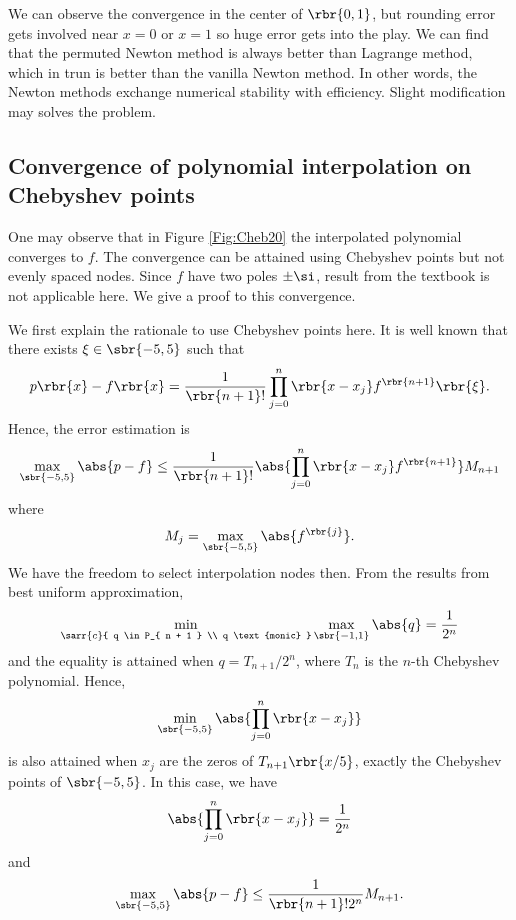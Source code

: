 \documentclass[english, nochinese]{pnote}
\begin{document}
We can observe the convergence in the center of $ \rbr{ 0, 1 } $, but rounding error gets involved near $ x = 0 $ or $ x = 1 $ so huge error gets into the play. We can find that the permuted Newton method is always better than Lagrange method, which in trun is better than the vanilla Newton method. In other words, the Newton methods exchange numerical stability with efficiency. Slight modification may solves the problem.

\subsection{Convergence of polynomial interpolation on Chebyshev points}

One may observe that in Figure \ref{Fig:Cheb20} the interpolated polynomial converges to $f$. The convergence can be attained using Chebyshev points but not evenly spaced nodes. Since $f$ have two poles $ \pm \si $, result from the textbook is not applicable here. We give a proof to this convergence.

We first explain the rationale to use Chebyshev points here. It is well known that there exists $ \xi \in \sbr{ -5, 5 } $ such that
\begin{equation}
p \rbr{x} - f \rbr{x} = \frac{1}{ \rbr{ n + 1 } ! } \prod_{ j = 0 }^n \rbr{ x - x_j } f^{\rbr{ n + 1 }} \rbr{\xi}.
\end{equation}
Hence, the error estimation is
\begin{equation}
\max_{\sbr{ -5, 5 }} \abs{ p - f } \le \frac{1}{ \rbr{ n + 1 } ! } \abs{ \prod_{ j = 0 }^n \rbr{ x - x_j } f^{\rbr{ n + 1 }} } M_{ n + 1 }
\end{equation}
where
\begin{equation}
M_j = \max_{\sbr{ -5, 5 }} \abs{f^{\rbr{j}}}.
\end{equation}
We have the freedom to select interpolation nodes then. From the results from best uniform approximation,
\begin{equation}
\min_{\sarr{c}{ q \in P_{ n + 1 } \\ q \text{monic} }} \max_{\sbr{ -1, 1 }} \abs{q} = \frac{1}{2^n}
\end{equation}
and the equality is attained when $ q = T_{ n + 1 } / 2^n $, where $T_n$ is the $n$-th Chebyshev polynomial. Hence,
\begin{equation}
\min_{\sbr{ -5, 5 }} \abs{ \prod_{ j = 0 }^n \rbr{ x - x_j } }
\end{equation}
is also attained when $x_j$ are the zeros of $ T_{ n + 1 } \rbr{ x / 5 } $, exactly the Chebyshev points of $ \sbr{ -5, 5 } $. In this case, we have
\begin{equation}
\abs{ \prod_{ j = 0 }^n \rbr{ x - x_j } } = \frac{1}{2^n}
\end{equation}
and
\begin{equation}
\max_{\sbr{ -5, 5 }} \abs{ p - f } \le \frac{1}{ \rbr{ n + 1 } ! 2^n }  M_{ n + 1 }.
\end{equation}
\end{document}
